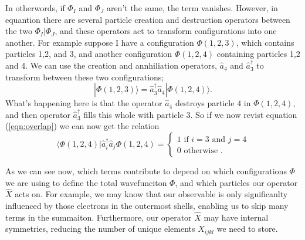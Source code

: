 \documentclass[12pt]{article}
\begin{document}
In otherwords, if $\Phi_{I}$ and $\Phi_{J}$ aren't the same, the term vanishes. However, in equantion 
\label{eqn:2el_expectation} there are several particle creation and destruction operators between the 
two $\Phi_{I} | \Phi_{J}$, and these operators act to transform configurations into one another. For example suppose
I have a configuration $\Phi(1,2,3)$, which contains particles 1,2, and 3, and another configuration $\Phi(1,2,4)$ 
containing particles 1,2 and 4. We can use the creation and annhiliation operators, $\hat{a}_{4}$
and $\hat{a}_{3}^{\dagger}$  to transform between these two configurations;
\begin{equation}
|\Phi(1,2,3)\rangle = \hat{a}_{3}^{\dagger}\hat{a}_{4} |\Phi(1,2,4)\rangle.
\end{equation}
What's happening here is that the operator $\hat{a}_{4}$ destroys particle $4$ in $\Phi(1,2,4)$, and then 
operator $\hat{a}^{\dagger}_{3}$ fills this whole with particle $3$. So if we now revist equation (\ref{eqn:overlap})
we can now get the relation 
\begin{equation}
\langle \Phi(1,2,4) |\hat{a}_{i}^{\dagger}\hat{a}_{j} \Phi(1,2,4) =
\begin{cases}
1 \text{\  \ \ \  \ \ \ \ if } i=3 \text{ \ \ and \ \ } j =4 \\
0 \text{ \ \ otherwise }. 
\end{cases}
\label{eqn:overlap_specific}
\end{equation}

As we can see now, which terms contribute to \label{eqn:2el_expectation} depend on which configurations $\Phi$ we are using to 
define the total wavefunciton $\Phi$, and which particles our operator $\hat{X}$ acts on. For example, we may know that 
our observable  is only significanlty influenced by those electrons in the outermost shells, enabling us to skip many terms in the 
summaiton. Furthermore, our operator $\hat{X}$ may have internal symmetries, reducing the number of unique elements $X_{ijkl}$ 
we need to store.\\
\end{document}
